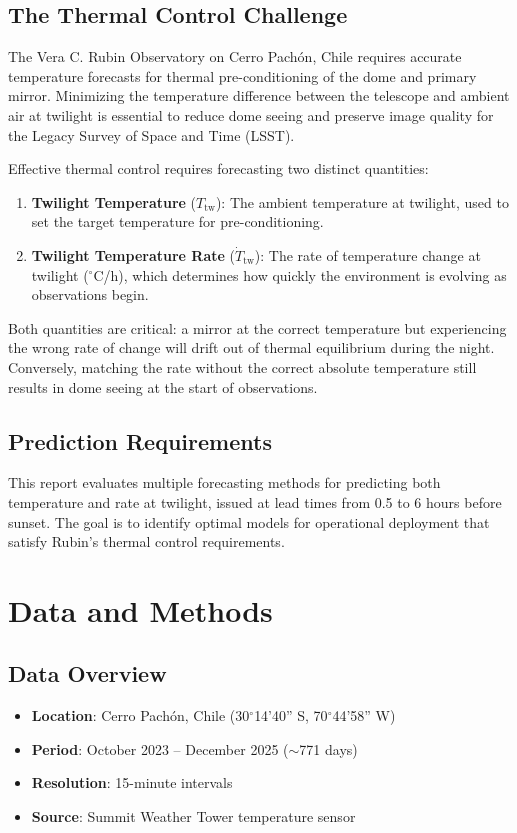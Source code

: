\documentclass[11pt]{article}
\begin{document}
\subsection{The Thermal Control Challenge}
The Vera C. Rubin Observatory on Cerro Pach\'on, Chile requires accurate temperature forecasts for thermal pre-conditioning of the dome and primary mirror. Minimizing the temperature difference between the telescope and ambient air at twilight is essential to reduce dome seeing and preserve image quality for the Legacy Survey of Space and Time (LSST).

Effective thermal control requires forecasting two distinct quantities:
\begin{enumerate}
    \item \textbf{Twilight Temperature} ($T_{\text{tw}}$): The ambient temperature at twilight, used to set the target temperature for pre-conditioning.
    \item \textbf{Twilight Temperature Rate} ($\dot{T}_{\text{tw}}$): The rate of temperature change at twilight ($^\circ$C/h), which determines how quickly the environment is evolving as observations begin.
\end{enumerate}

Both quantities are critical: a mirror at the correct temperature but experiencing the wrong rate of change will drift out of thermal equilibrium during the night. Conversely, matching the rate without the correct absolute temperature still results in dome seeing at the start of observations.

\subsection{Prediction Requirements}
This report evaluates multiple forecasting methods for predicting both temperature and rate at twilight, issued at lead times from 0.5 to 6 hours before sunset. The goal is to identify optimal models for operational deployment that satisfy Rubin's thermal control requirements.

\section{Data and Methods}

\subsection{Data Overview}
\begin{itemize}
    \item \textbf{Location}: Cerro Pach\'on, Chile (30$^\circ$14'40'' S, 70$^\circ$44'58'' W)
    \item \textbf{Period}: October 2023 -- December 2025 ($\sim$771 days)
    \item \textbf{Resolution}: 15-minute intervals
    \item \textbf{Source}: Summit Weather Tower temperature sensor
\end{itemize}
\end{document}
